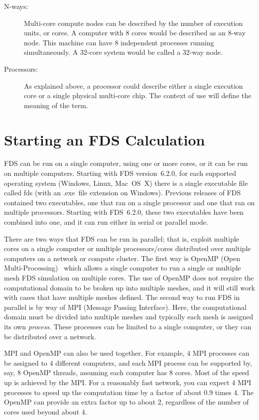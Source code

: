 \documentclass[11pt]{book}
\begin{document}
\begin{description}
\item[N-ways:] Multi-core compute nodes can be described by the number of execution units, or cores. A computer with 8 cores would be described as an 8-way node. This machine can have 8 independent processes running simultaneously. A 32-core system would be called a 32-way node.
\item[Processors:] As explained above, a processor could describe either a single execution core or a single physical multi-core chip. The context of use will define the meaning of the term.
\end{description}

\section{Starting an FDS Calculation}

FDS can be run on a single computer, using one or more cores, or it can be run on multiple computers. Starting with FDS version~6.2.0, for each supported operating system (Windows, Linux, Mac~OS~X) there is a single executable file called {\ct fds} (with an {\ct .exe}\ file extension on Windows). Previous releases of FDS contained two executables, one that ran on a single processor and one that ran on multiple processors. Starting with FDS~6.2.0, these two executables have been combined into one, and it can run either in serial or parallel mode.

There are two ways that FDS can be run in parallel; that is, exploit multiple cores on a single computer or multiple processors/cores distributed over multiple computers on a network or compute cluster. The first way is OpenMP (Open Multi-Processing)~\cite{Chapman:OpenMP} which allows a single computer to run a single or multiple mesh FDS simulation on multiple cores. The use of OpenMP does not require the computational domain to be broken up into multiple meshes, and it will still work with cases that have multiple meshes defined. The second way to run FDS in parallel is by way of MPI (Message Passing Interface). Here, the computational domain must be divided into multiple meshes and typically each mesh is assigned its own {\em process}. These processes can be limited to a single computer, or they can be distributed over a network.

MPI and OpenMP can also be used together. For example, 4 MPI processes can be assigned to 4 different computers, and each MPI process can be supported by, say, 8 OpenMP threads, assuming each computer has 8 cores. Most of the speed up is achieved by the MPI. For a reasonably fast network, you can expect 4 MPI processes to speed up the computation time by a factor of about 0.9 times 4. The OpenMP can provide an extra factor up to about 2, regardless of the number of cores used beyond about 4.
\end{document}
